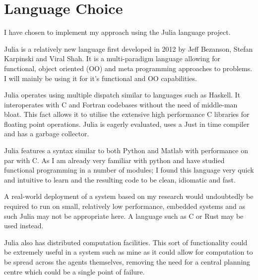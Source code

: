 \section{Language Choice}

I have chosen to implement my approach using the Julia language project\cite{JuliaProgrammingLanguage}.

Julia is a relatively new language first developed in 2012 by Jeff Bezanson, Stefan Karpinski and Viral Shah. It is a multi-paradigm language allowing for functional, object oriented (OO) and meta programming approaches to problems. I will mainly be using it for it's functional and OO capabilities.

Julia operates using multiple dispatch similar to languages such as Haskell. It interoperates with C and Fortran codebases without the need of middle-man bloat. This fact allows it to utilise the extensive high performance C libraries for floating point operations. Julia is eagerly evaluated, uses a Just in time compiler and has a garbage collector.

Julia features a syntax similar to both Python and Matlab with performance on par with C. As I am already very familiar with python and have studied functional programming in a number of modules; I found this language very quick and intuitive to learn and the resulting code to be clean, idiomatic and fast.

A real-world deployment of a system based on my research would undoubtedly be required to run on small, relatively low performance, embedded systems and as such Julia may not be appropriate here. A language such as C or Rust may be used instead.

Julia also has distributed computation facilities. This sort of functionality could be extremely useful in a system such as mine as it could allow for computation to be spread across the agents themselves, removing the need for a central planning centre which could be a single point of failure.






